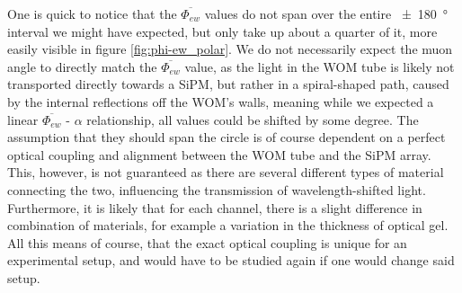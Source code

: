     
   

    
    
    One is quick to notice that the $\overline{\Phi_{ew}}$ values do not span over the entire \SI{\pm 180}{\degree} interval we might have expected, but only take up about a quarter of it, more easily visible in figure \ref{fig:phi-ew_polar}. 
    We do not necessarily expect the muon angle to directly match the $\overline{\Phi_{ew}}$ value, as the light in the \ac{WOM} tube is likely not transported directly towards a \ac{SiPM}, but rather in a spiral-shaped path, caused by the internal reflections off the \ac{WOM}'s walls, meaning while we expected a linear $\overline{\Phi_{ew}}$ - $\alpha$ relationship, all values could be shifted by some degree.
    The assumption that they should span the circle is of course dependent on a perfect optical coupling and alignment between the \ac{WOM} tube and the \ac{SiPM} array. This, however, is not guaranteed as there are several different types of material connecting the two, influencing the transmission of wavelength-shifted light. Furthermore, it is likely that for each channel, there is a slight difference in combination of materials, for example a variation in the thickness of optical gel. All this means of course, that the exact optical coupling is unique for an experimental setup, and would have to be studied again if one would change said setup.
    
